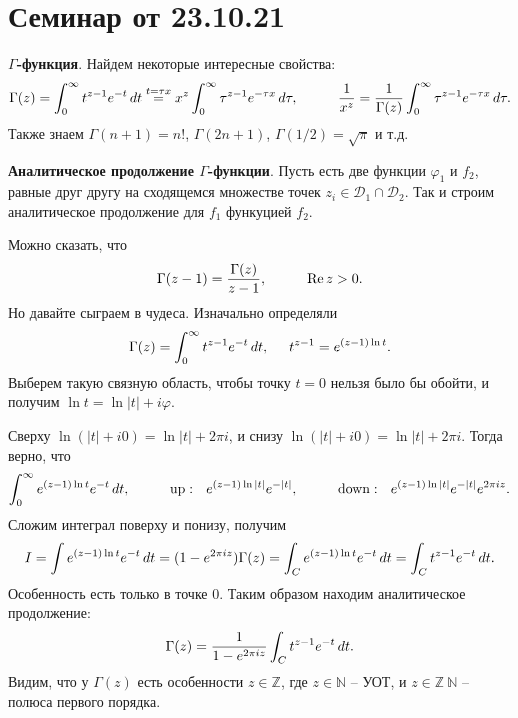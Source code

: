 \section{Семинар от 23.10.21}


\textbf{$\Gamma$-функция}. Найдем некоторые интересные свойства:
\begin{equation*}
    \Gamma(z) = \int_{0}^{\infty} t^{z-1} e^{-t} \d t \overset{t = \tau x}{=} 
    x^z \int_{0}^{\infty} \tau^{z-1} e^{- \tau x} \d \tau,
    \hspace{10 mm} 
    \frac{1}{x^z} = \frac{1}{\Gamma(z)} \int_{0}^{\infty} \tau^{z-1} e^{- \tau x} \d \tau.
\end{equation*}
Также знаем $\Gamma(n+1) = n!$, $\Gamma(2n+1)$, $\Gamma(1/2) = \sqrt{\pi}$ и т.д.



\textbf{Аналитическое продолжение $\Gamma$-функции}. Пусть есть две функции $\varphi_1$ и $f_2$, равные друг другу на сходящемся множестве точек $z_i \in \mathcal D_1 \cap \mathcal D_2$. Так и строим аналитическое продолжение для $f_1$ функуцией $f_2$.


Можно сказать, что 
\begin{equation*}
    \Gamma(z-1) = \frac{\Gamma(z)}{z-1}, \hspace{10 mm} \Re z > 0.
\end{equation*}
Но давайте сыграем в чудеса. Изначально определяли
\begin{equation*}
    \Gamma(z) = \int_{0}^{\infty} t^{z-1} e^{-t} \, d t,
    \hspace{5 mm} 
    t^{z-1} = e^{(z-1) \ln t}.
\end{equation*}
Выберем такую связную область, чтобы точку $t = 0$ нельзя было бы обойти, и получим $\ln t = \ln |t| + i \varphi$. 

Сверху $\ln (|t| + i 0) = \ln |t| + 2 \pi i$, и снизу $\ln (|t| + i 0) = \ln |t| + 2 \pi i$. Тогда верно, что
\begin{equation*}
    \int_{0}^{\infty} e^{(z-1)\ln t} e^{-t} \d t,
    \hspace{10 mm} 
    \text{up}: \ \ e^{(z-1) \ln |t|} e^{-|t|},
    \hspace{10 mm} 
    \text{down}: \ \ e^{(z-1) \ln |t|} e^{-|t|} e^{2 \pi i z}.
\end{equation*}
Сложим интеграл поверху и понизу, получим 
\begin{equation*}
    I = \int e^{(z-1)\ln t} e^{-t} \, d t = (1 -e^{2 \pi i z}) \Gamma(z) 
    = \int_C e^{(z-1) \ln t} e^{- t} \, d t = \int_C t^{z-1} e^{-t} \, d t.
\end{equation*}
Особенность есть только в точке $0$. Таким образом находим аналитическое продолжение:
\begin{equation}
    \Gamma(z) = \frac{1}{1-e^{2 \pi i z}} \int_C t^{z-1} e^{-t} \, d t.
\end{equation}
Видим, что у $\Gamma(z)$ есть особенности $z \in \mathbb{Z}$, где $z \in \mathbb{N}$ -- УОТ, и $z \in \mathbb{Z}\ \mathbb{N}$ -- полюса первого порядка.


